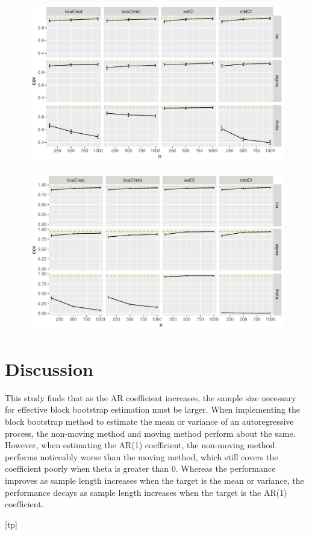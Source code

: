 \documentclass[12pt, letterpaper, titlepage]{article}
\begin{document}
\begin{figure}[tbp]
\caption{}
  \centering
  \includegraphics[width=\textwidth]{figures/plot_.3}
  \caption{}
  \label{fig:plot_.3}
\end{figure}

\begin{figure}[tbp]
\caption{}
  \centering
  \includegraphics[width=\textwidth]{figures/plot_.5}
  \caption{}
  \label{fig:plot_.5}
\end{figure}

\section{Discussion}
\label{sec:discuss}

This study finds that as the AR coefficient increases, the sample size necessary for effective block bootstrap estimation must be larger. When implementing the block bootstrap method to estimate the mean or variance of an autoregressive process, the non-moving method and moving method perform about the same. However, when estimating the AR(1) coefficient, the non-moving method performs noticeably worse than the moving method, which still covers the coefficient poorly when theta is greater than 0. Whereas the performance improves as sample length increases when the target is the mean or variance, the performance decays as sample length increases when the target is the AR(1) coefficient.



[tp]
\end{document}
